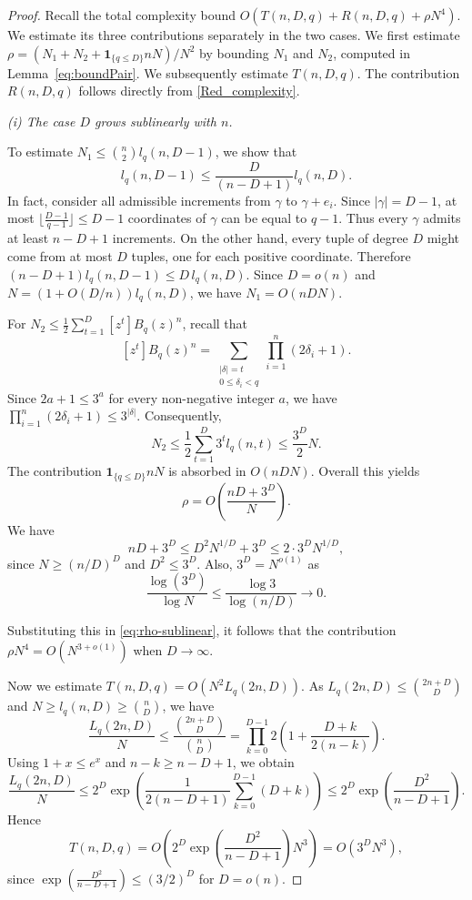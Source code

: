 \documentclass[a4paper, 12pt, oneside, openright]{article}
\begin{document}
\begin{proof}
Recall the total complexity bound $O\left(T(n,D,q)+R(n,D,q)+\rho N^4\right).$
We estimate its three contributions separately in the two cases. We first estimate $\rho=(N_1+N_2+\mathbf{1}_{\{q\le D\}}nN)/N^2$ by bounding $N_1$ and $ N_2$, computed in Lemma~\eqref{eq:boundPair}. We subsequently estimate $T(n,D,q).$
The contribution $R(n,D,q)$ follows directly from \eqref{Red_complexity}.

\medskip
\noindent\textit{(i) The case $D$ grows sublinearly with $n$.}

\smallskip
\noindent
To estimate $N_1 \le \binom{n}{2}l_q(n,D-1)$, we show that
\[
l_q(n,D-1)\le\frac{D}{(n-D+1)}l_q(n,D).
\]
In fact, consider all admissible increments from $\gamma$ to $\gamma+e_i$. Since $|\gamma|=D-1$, at most $\lfloor\frac{D-1}{q-1}\rfloor \le D-1$ coordinates of $\gamma$ can be equal to $q-1$. Thus every $\gamma$ admits at least $n-D+1$ increments. On the other hand, every tuple of degree $D$ might come from at most $D$ tuples, one for each positive coordinate. Therefore
$(n-D+1)l_q(n,D-1)\le D\,l_q(n,D).$
Since $D=o(n)$ and $N= (1+ O(D/n ) )l_q(n,D)$, we have $N_1=O(nDN).$

For $N_2\leq\frac{1}{2} \sum_{t=1}^{D}[z^t]B_q(z)^n$, recall that
\[
[z^t]B_q(z)^n=
\sum_{\substack{|\delta|=t\\0\leq\delta_i<q}}
\prod_{i=1}^n(2\delta_i+1).
\]
Since $2a+1\le 3^a$ for every non-negative integer $a$, we have $\prod_{i=1}^n(2\delta_i+1)\le 3^{|\delta|}.$
Consequently,
\[
N_2 \le\frac12\sum_{t=1}^D3^t l_q(n,t) \le \frac{3^D}{2}N.
\]
The contribution $\mathbf{1}_{\{q\le D\}}nN$ is absorbed in $O(nDN).$
Overall this yields
\begin{equation}
\label{eq:rho-sublinear}
\rho =
O\left(
\frac{nD+3^D}{N}
\right).
\end{equation}
We have
\[
nD+3^D
\le D^2N^{1/D}+3^D
\le 2\cdot3^D N^{1/D},
\]
since $N\ge(n/D)^D$  and $D^2\le 3^D$. Also, $3^D=N^{o(1)}$ as
\[
\frac{\log(3^D)}{\log N}
\le \frac{\log 3}{\log(n/D)}
\longrightarrow 0.
\]

Substituting this in \eqref{eq:rho-sublinear}, it follows that the contribution $\rho N^4= O(N^{3+o(1)})$ when $D \to \infty$. 

\smallskip
\noindent
Now we estimate $T(n,D,q)=O( N^2 L_q(2n,D)).$ As $L_q(2n,D)\leq\binom{2n+D}{D}$ and $N\geq l_q(n,D)\geq\binom nD$, we have
\[
\frac{L_q(2n,D)}{N}\leq
\frac{\binom{2n+D}{D}}{\binom{n}{D}}=
\prod_{k=0}^{D-1}
2\left(1+\frac{D+k}{2(n-k)}\right).
\]
Using $1+x\leq e^x$ and $n-k\geq n-D+1$, we obtain
\[
\frac{L_q(2n,D)}{N}\leq
2^D \exp\left(
\frac{1}{2(n-D+1)}
\sum_{k=0}^{D-1}(D+k)
\right)
\leq
2^D\exp\left(
\frac{D^2}{n-D+1}
\right).
\]
Hence
\[
T(n,D,q) =
O\left(
2^D \exp\left(
\frac{D^2}{n-D+1}
\right) N^3 \right)=O(3^D N^3),
\]
since $\exp\left(\frac{D^2}{n-D+1}\right) \le (3/2)^D$ for $D=o(n)$.


\end{proof}
\end{document}
